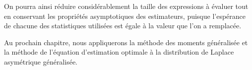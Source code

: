 On pourra ainsi réduire considérablement la taille des expressions à
évaluer tout en conservant les propriétés asymptotiques des
estimateurs, puisque l'espérance de chacune des statistiques utilisées
est égale à la valeur que l'on a remplacée.

Au prochain chapitre, nous appliquerons la méthode des moments
généralisée et la méthode de l'équation d'estimation optimale à la
distribution de Laplace asymétrique généralisée.

